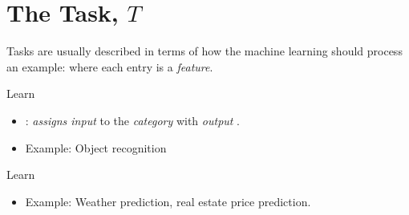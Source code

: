 \documentclass[
	title={ML Fundamentals}
]{cs584notes}
\begin{document}
\section{The Task, $T$}\label{sec:the-task}
Tasks are usually described in terms of how the machine learning should process an example:  where each entry  is a \emph{feature}.
\begin{description}[font=\color{emphblue}]
	\item[Classification:] Learn 
	\begin{itemize}
		\item {}: \emph{assigns input} to the \emph{category} with \emph{output} .
		\item Example: Object recognition
	\end{itemize}
	\item[Regression:] Learn 
	\begin{itemize}
		\item Example: Weather prediction, real estate price prediction.
	\end{itemize}
\end{description}
\end{document}
